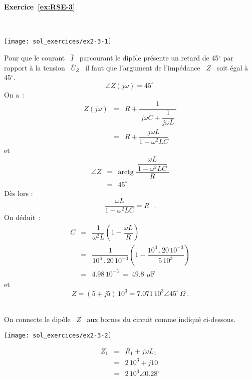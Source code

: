 \paragraph{Exercice~\ref{ex:RSE-3}}~\\%
\begin{center}
	\texttt{[image: sol\_exercices/ex2-3-1]}
\end{center}
Pour que le courant \ $\bar{I}$ \ parcourant le dip\^{o}le présente un
retard de 45$^{\circ}$ par rapport à la tension \ $\bar{U}_Z$~ il faut
que l'argument de l'impédance \ $Z$ \ soit égal à 45$^{\circ}$.
\[\angle Z(j\omega ) = 45^{\circ}~ \]
On a~:
\begin{eqnarray*}
	Z(j\omega ) &=& R + \dfrac{1}{~j\omega C + \dfrac{1}{j\omega L}~}\\
	&=&  R + \dfrac{j\omega L}{1 -\omega^2 LC}
\end{eqnarray*}
et
\begin{eqnarray*}
	\angle Z & = & \mbox{arctg}~\dfrac{~\dfrac{\omega L}{1 - \omega^2 LC}~}{R}\\
	& = & 45^{\circ}
\end{eqnarray*}
Dès lors :
\[\dfrac{\omega L}{1 - \omega^2 LC} = R\text{~~.}\]
On déduit~:
\begin{eqnarray*}
	C &=& \dfrac{1}{\omega^2 L} \left( 1 - \dfrac{\omega L}{R} \right)\\
	&=& \dfrac{1}{10^6\, .\, 20\, 10^{-3}} 
	\left( 1 - \dfrac{10^3\, . \, 20\, 10^{-3}}{5 \, 10^3} \right) \\
	&=& 4.98\, 10^{-5} \: = \: 49.8 \,\, \mu\text{F}
\end{eqnarray*}
et
\[Z=(5+j 5)\,10^3=
7.071 \, 10^3 \angle 45^{\circ} \, \Omega~.\]

\\
On connecte le dip\^{o}le \ $Z$ \ aux bornes du circuit comme indiqué ci-dessous.

\noindent\parbox[c]{8cm}{
\begin{center}
	\texttt{[image: sol\_exercices/ex2-3-2]}
\end{center}}
\parbox[c]{3cm}{
	\begin{eqnarray*}
		Z_1 &=& R_1 + j\omega L_1\\
		&=& 2\, 10^3 + j10\\
		&=& 2\, 10^3 \angle 0.28^{\circ}
\end{eqnarray*}}

